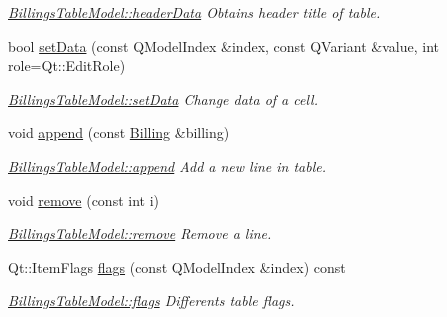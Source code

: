 \begin{DoxyCompactItemize}
\begin{DoxyCompactList}\small\item\em \hyperlink{classGui_1_1Widgets_1_1WdgModels_1_1BillingsTableModel_af441051dcb0c702ca9d390405bd8bbc9}{Billings\-Table\-Model\-::header\-Data} Obtains header title of table. \end{DoxyCompactList}\item 
bool \hyperlink{classGui_1_1Widgets_1_1WdgModels_1_1BillingsTableModel_a5df8b1b23dbd38d2244cabf91e481fd5}{set\-Data} (const Q\-Model\-Index \&index, const Q\-Variant \&value, int role=Qt\-::\-Edit\-Role)
\begin{DoxyCompactList}\small\item\em \hyperlink{classGui_1_1Widgets_1_1WdgModels_1_1BillingsTableModel_a5df8b1b23dbd38d2244cabf91e481fd5}{Billings\-Table\-Model\-::set\-Data} Change data of a cell. \end{DoxyCompactList}\item 
void \hyperlink{classGui_1_1Widgets_1_1WdgModels_1_1BillingsTableModel_aff58949de7e18482ad09bf2635e1997c}{append} (const \hyperlink{classModels_1_1Billing}{Billing} \&billing)
\begin{DoxyCompactList}\small\item\em \hyperlink{classGui_1_1Widgets_1_1WdgModels_1_1BillingsTableModel_aff58949de7e18482ad09bf2635e1997c}{Billings\-Table\-Model\-::append} Add a new line in table. \end{DoxyCompactList}\item 
void \hyperlink{classGui_1_1Widgets_1_1WdgModels_1_1BillingsTableModel_a0946d335077398f9c35f554340139ba6}{remove} (const int i)
\begin{DoxyCompactList}\small\item\em \hyperlink{classGui_1_1Widgets_1_1WdgModels_1_1BillingsTableModel_a0946d335077398f9c35f554340139ba6}{Billings\-Table\-Model\-::remove} Remove a line. \end{DoxyCompactList}\item 
Qt\-::\-Item\-Flags \hyperlink{classGui_1_1Widgets_1_1WdgModels_1_1BillingsTableModel_ab130d7853a7db8df5d57efc9a2854a4d}{flags} (const Q\-Model\-Index \&index) const 
\begin{DoxyCompactList}\small\item\em \hyperlink{classGui_1_1Widgets_1_1WdgModels_1_1BillingsTableModel_ab130d7853a7db8df5d57efc9a2854a4d}{Billings\-Table\-Model\-::flags} Differents table flags. \end{DoxyCompactList}\item 

\end{DoxyCompactItemize}
